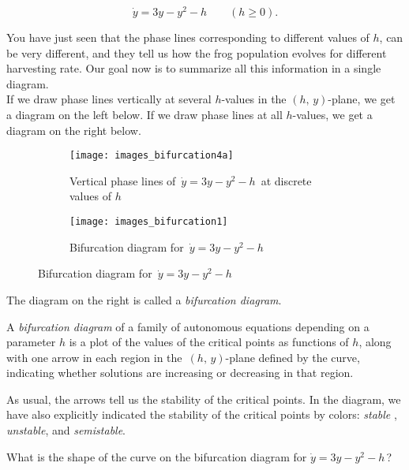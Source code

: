 \begin{equation*}
  \dot y = 3y - y^2 - h \qquad (h \geq 0). 
\end{equation*}

You have just seen that the phase lines corresponding to different values of $h$,
can be very different, and they tell us how the frog population evolves for different harvesting rate.
Our goal now is to summarize all this information in a single diagram.\\

If we draw phase lines vertically at several $h$-values in the $(h,\,y)$-plane,
we get a diagram on the left below.
If we draw phase lines at all $h$-values, we get a diagram on the right below.

\begin{figure}[ht!]
  \centering
  \begin{subfigure}[b]{.49\textwidth}
    \centering
    \texttt{[image: images\_bifurcation4a]}
    \caption{Vertical phase lines of $\, \dot y = 3y - y^2 - h\,$ at discrete values of $h$}
  \end{subfigure}
  \begin{subfigure}[b]{.49\textwidth}
    \centering
    \texttt{[image: images\_bifurcation1]}
    \caption{Bifurcation diagram for $\, \dot y = 3y - y^2 - h\,$}
  \end{subfigure}
\end{figure}

The diagram on the right is called a \emph{\color{blue}bifurcation diagram}.\\

\begin{definition}
  A \emph{\color{blue} bifurcation diagram} of a family of autonomous equations
  depending on a parameter $h$ is a plot of the values of the critical points as functions of $h$,
  along with one arrow in each region in the $\, (h, \, y)$-plane defined by the curve,
  indicating whether solutions are increasing or decreasing in that region.
\end{definition}

As usual, the arrows tell us the stability of the critical points.
In the diagram, we have also explicitly indicated the stability of the critical points by colors:
\emph{\color{blue}stable} , \emph{\color{orange}unstable}, and \emph{semistable}.

\begin{question}
  What is the shape of the curve on the bifurcation diagram for $\dot y = 3y - y^2 - h\,$?
\end{question}

